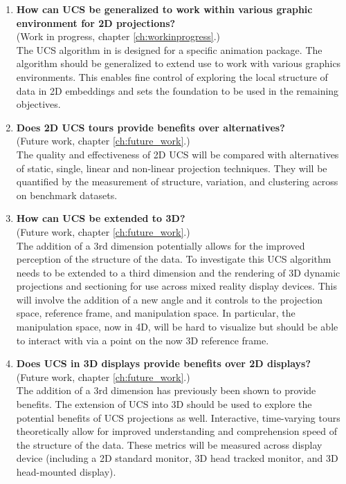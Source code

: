 \documentclass{monashthesis}
\begin{document}
\begin{enumerate}
\def\labelenumi{\arabic{enumi}.}
\item
  \textbf{How can UCS be generalized to work within various graphic
  environment for 2D projections?}\\
  (Work in progress, chapter \ref{ch:workinprogress}.)\\
  The UCS algorithm in \textcite{cook_manual_1997} is designed for a
  specific animation package. The algorithm should be generalized to
  extend use to work with various graphics environments. This enables
  fine control of exploring the local structure of data in 2D embeddings
  and sets the foundation to be used in the remaining objectives.
\item
  \textbf{Does 2D UCS tours provide benefits over alternatives?}\\
  (Future work, chapter \ref{ch:future_work}.)\\
  The quality and effectiveness of 2D UCS will be compared with
  alternatives of static, single, linear and non-linear projection
  techniques. They will be quantified by the measurement of structure,
  variation, and clustering across on benchmark datasets.
\item
  \textbf{How can UCS be extended to 3D?}\\
  (Future work, chapter \ref{ch:future_work}.)\\
  The addition of a 3rd dimension potentially allows for the improved
  perception of the structure of the data. To investigate this UCS
  algorithm needs to be extended to a third dimension and the rendering
  of 3D dynamic projections and sectioning for use across mixed reality
  display devices. This will involve the addition of a new angle and it
  controls to the projection space, reference frame, and manipulation
  space. In particular, the manipulation space, now in 4D, will be hard
  to visualize but should be able to interact with via a point on the
  now 3D reference frame.
\item
  \textbf{Does UCS in 3D displays provide benefits over 2D displays?}\\
  (Future work, chapter \ref{ch:future_work}.)\\
  The addition of a 3rd dimension has previously been shown to provide
  benefits. The extension of UCS into 3D should be used to explore the
  potential benefits of UCS projections as well. Interactive,
  time-varying tours theoretically allow for improved understanding and
  comprehension speed of the structure of the data. These metrics will
  be measured across display device (including a 2D standard monitor, 3D
  head tracked monitor, and 3D head-mounted display).
\end{enumerate}
\end{document}
